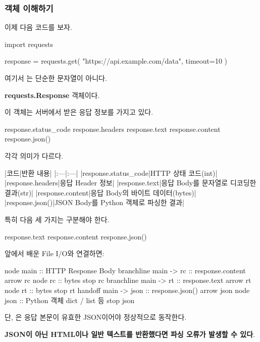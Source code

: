 \subsubsection{객체 이해하기}

이제 다음 코드를 보자.

\begin{dhkcode}
import requests

response = requests.get(
    "https://api.example.com/data",
    timeout=10
)
\end{dhkcode}

여기서 는 단순한 문자열이 아니다.

\textbf{requests.Response} 객체이다.

이 객체는 서버에서 받은 응답 정보를 가지고 있다.

\begin{dhkcode}
response.status_code
response.headers
response.text
response.content
response.json()
\end{dhkcode}

각각 의미가 다르다.

\begin{dhktable}
|코드|반환 내용|
|:---|:---|
|response.status_code|HTTP 상태 코드(int)|
|response.headers|응답 Header 정보|
|response.text|응답 Body를 문자열로 디코딩한 결과(str)|
|response.content|응답 Body의 바이트 데이터(bytes)|
|response.json()|JSON Body를 Python 객체로 파싱한 결과|
\end{dhktable}

특히 다음 세 가지는 구분해야 한다.

\begin{dhkcode}
response.text
response.content
response.json()
\end{dhkcode}

앞에서 배운 File I/O와 연결하면:

\begin{dhkbranch}[in=8]
node main :: HTTP Response Body
branchline main -> rc :: response.content
arrow rc
node rc :: bytes
stop rc
branchline main -> rt :: response.text
arrow rt
node rt :: bytes
stop rt
handoff main -> json :: response.json()
arrow json
node json :: Python 객체 dict / list 등
stop json
\end{dhkbranch}

단, 은 응답 본문이 유효한 JSON이어야 정상적으로 동작한다.

\textbf{JSON이 아닌 HTML이나 일반 텍스트를 반환했다면 파싱 오류가 발생할 수 있다}.

